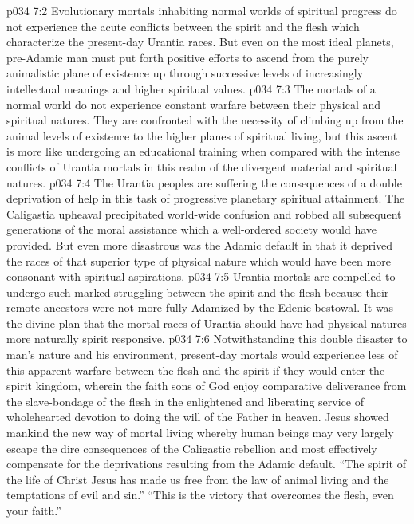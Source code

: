 \vs p034 7:2 Evolutionary mortals inhabiting normal worlds of spiritual progress do not experience the acute conflicts between the spirit and the flesh which characterize the present\hyp{}day Urantia races. But even on the most ideal planets, pre\hyp{}Adamic man must put forth positive efforts to ascend from the purely animalistic plane of existence up through successive levels of increasingly intellectual meanings and higher spiritual values.
\vs p034 7:3 The mortals of a normal world do not experience constant warfare between their physical and spiritual natures. They are confronted with the necessity of climbing up from the animal levels of existence to the higher planes of spiritual living, but this ascent is more like undergoing an educational training when compared with the intense conflicts of Urantia mortals in this realm of the divergent material and spiritual natures.
\pc \vs p034 7:4 The Urantia peoples are suffering the consequences of a double deprivation of help in this task of progressive planetary spiritual attainment. The Caligastia upheaval precipitated world\hyp{}wide confusion and robbed all subsequent generations of the moral assistance which a well\hyp{}ordered society would have provided. But even more disastrous was the Adamic default in that it deprived the races of that superior type of physical nature which would have been more consonant with spiritual aspirations.
\vs p034 7:5 Urantia mortals are compelled to undergo such marked struggling between the spirit and the flesh because their remote ancestors were not more fully Adamized by the Edenic bestowal. It was the divine plan that the mortal races of Urantia should have had physical natures more naturally spirit responsive.
\pc \vs p034 7:6 Notwithstanding this double disaster to man’s nature and his environment, present\hyp{}day mortals would experience less of this apparent warfare between the flesh and the spirit if they would enter the spirit kingdom, wherein the faith sons of God enjoy comparative deliverance from the slave\hyp{}bondage of the flesh in the enlightened and liberating service of wholehearted devotion to doing the will of the Father in heaven. Jesus showed mankind the new way of mortal living whereby human beings may very largely escape the dire consequences of the Caligastic rebellion and most effectively compensate for the deprivations resulting from the Adamic default. “The spirit of the life of Christ Jesus has made us free from the law of animal living and the temptations of evil and sin.” “This is the victory that overcomes the flesh, even your faith.”\plusone
